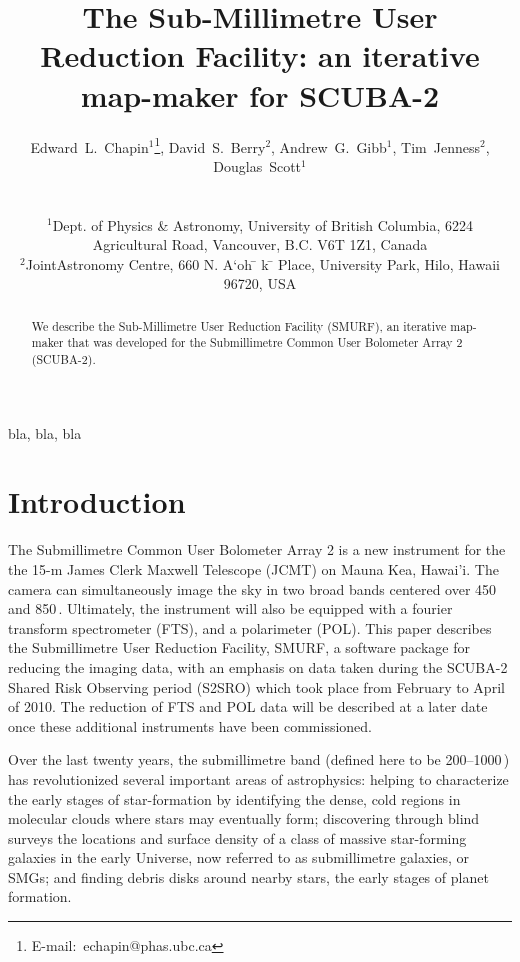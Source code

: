 \documentclass[useAMS,usenatbib,usegraphicx,nofootinbib]{mn2e}
\title[SMURF: an iterative map-maker for SCUBA-2]{The Sub-Millimetre User
Reduction Facility: an iterative map-maker for SCUBA-2}
\author[Edward~L.~Chapin~et~al.]{
  \parbox[t]{\textwidth}{
    Edward~L.~Chapin$^{1}$\thanks{E-mail:~echapin@phas.ubc.ca},
    David~S.~Berry$^{2}$,
    Andrew~G.~Gibb$^{1}$,
    Tim~Jenness$^{2}$,
    Douglas~Scott$^{1}$
  }
  \\
  \\
  $^{1}$Dept. of Physics \& Astronomy, University of British Columbia,
  6224 Agricultural Road, Vancouver, B.C. V6T 1Z1, Canada\\
  $^{2}$JointAstronomy Centre, 660 N. A‘oh ̄ k ̄ Place, University Park, Hilo, Hawaii 96720, USA}
\newcommand{\scuba}{SCUBA-2}
\begin{document}
\label{firstpage}

\maketitle

\begin{abstract}
  We describe the Sub-Millimetre User Reduction Facility (SMURF), an
  iterative map-maker that was developed for the Submillimetre Common
  User Bolometer Array 2 (SCUBA-2).
\end{abstract}


\begin{keywords}
bla, bla, bla
\end{keywords}

\section{Introduction}
\label{sec:intro}

The Submillimetre Common User Bolometer Array 2
\citep[\scuba,][]{holland2006} is a new instrument for the the 15-m
James Clerk Maxwell Telescope (JCMT) on Mauna Kea, Hawai'i. The camera
can simultaneously image the sky in two broad bands centered over 450
and 850\,\micron. Ultimately, the instrument will also be equipped
with a fourier transform spectrometer (FTS), and a polarimeter
(POL). This paper describes the Submillimetre User Reduction Facility,
SMURF, a software package for reducing the imaging data, with an
emphasis on data taken during the SCUBA-2 Shared Risk Observing period
(S2SRO) which took place from February to April of 2010. The reduction
of FTS and POL data will be described at a later date once these
additional instruments have been commissioned.

Over the last twenty years, the submillimetre band (defined here to be
200--1000\,\micron) has revolutionized several important areas of
astrophysics: helping to characterize the early stages of
star-formation by identifying the dense, cold regions in molecular
clouds where stars may eventually form; discovering through blind
surveys the locations and surface density of a class of massive
star-forming galaxies in the early Universe, now referred to as
submillimetre galaxies, or SMGs; and finding debris disks around
nearby stars, the early stages of planet formation.
\end{document}
